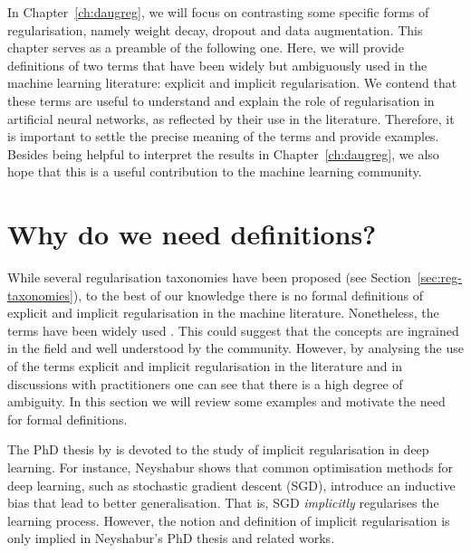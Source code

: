 {In Chapter~\ref{ch:daugreg}, we will focus on contrasting some specific forms of regularisation, namely weight decay, dropout and data augmentation. This chapter serves as a preamble of the following one. Here, we will provide definitions of two terms that have been widely but ambiguously used in the machine learning literature: explicit and implicit regularisation. We contend that these terms are useful to understand and explain the role of regularisation in artificial neural networks, as reflected by their use in the literature. Therefore, it is important to settle the precise meaning of the terms and provide examples. Besides being helpful to interpret the results in Chapter~\ref{ch:daugreg}, we also hope that this is a useful contribution to the machine learning community.

\section{Why do we need definitions?}
\label{sec:reg-why}
While several regularisation taxonomies have been proposed (see Section~\ref{sec:reg-taxonomies}), to the best of our knowledge there is no formal definitions of explicit and implicit regularisation in the machine literature. Nonetheless, the terms have been widely used \cite{neyshabur2014implicitreg, zhang2016understandingdl, wilson2017neurips, mesnil2011transferlearning, poggio2017theory3, martin2018selfregularisation, achille2018emergence}. This could suggest that the concepts are ingrained in the field and well understood by the community. However, by analysing the use of the terms explicit and implicit regularisation in the literature and in discussions with practitioners one can see that there is a high degree of ambiguity. In this section we will review some examples and motivate the need for formal definitions.

The PhD thesis by \citet{neyshabur2017thesis} is devoted to the study of implicit regularisation in deep learning. For instance, Neyshabur shows that common optimisation methods for deep learning, such as stochastic gradient descent (SGD), introduce an inductive bias that lead to better generalisation. That is, SGD \textit{implicitly} regularises the learning process. However, the notion and definition of implicit regularisation is only implied in Neyshabur's PhD thesis and related works. 

}
